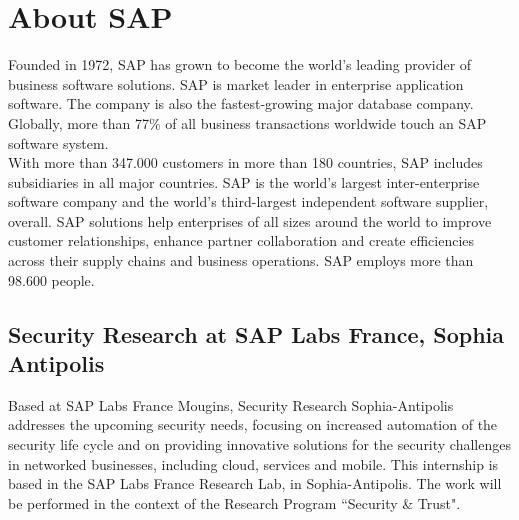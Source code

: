 \chapter*{About SAP}

Founded in 1972, SAP has grown to become the world's leading provider of business software solutions. SAP is market leader in enterprise application software. The company is also the fastest-growing major database company. Globally, more than 77\% of all business transactions worldwide touch an SAP software system. \\

With more than 347.000 customers in more than 180 countries, SAP includes subsidiaries in all major countries. SAP is the world's largest inter-enterprise software company and the world's third-largest independent software supplier, overall. SAP solutions help enterprises of all sizes around the world to improve customer relationships, enhance partner collaboration and create efficiencies across their supply chains and business operations. SAP employs more than 98.600 people.

\section{Security Research at SAP Labs France, Sophia Antipolis} 

Based at SAP Labs France Mougins, Security Research Sophia-Antipolis\cite{sap} addresses the upcoming security needs, focusing on increased automation of the security life cycle and on providing innovative solutions for the security challenges in networked businesses, including cloud, services and mobile. This internship is based in the SAP Labs France Research Lab, in Sophia-Antipolis. The work will be performed in the context of the Research Program “Security {\&} Trust".